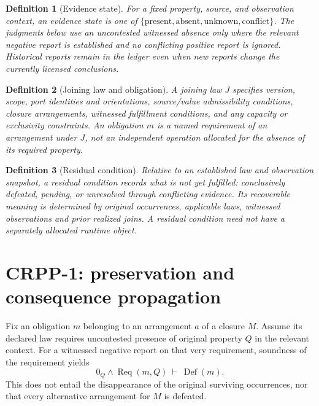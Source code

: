\documentclass[11pt]{article}
\newtheorem{definition}{Definition}[section]
\newcommand{\Req}{\operatorname{Req}}
\newcommand{\Def}{\operatorname{Def}}
\begin{document}
\begin{definition}[Evidence state]
For a fixed property, source, and observation context, an evidence state is
one of $\{\mathrm{present},\mathrm{absent},\mathrm{unknown},\mathrm{conflict}\}$.
The judgments below use an uncontested witnessed absence only where the
relevant negative report is established and no conflicting positive report
is ignored. Historical reports remain in the ledger even when new reports
change the currently licensed conclusions.
\end{definition}

\begin{definition}[Joining law and obligation]
A joining law $J$ specifies version, scope, port identities and orientations,
source/value admissibility conditions, closure arrangements, witnessed
fulfillment conditions, and any capacity or exclusivity constraints.
An obligation $m$ is a named requirement of an arrangement under $J$,
not an independent operation allocated for the absence of its required
property.
\end{definition}

\begin{definition}[Residual condition]
Relative to an established law and observation snapshot, a residual
condition records what is \emph{not yet fulfilled}: conclusively
defeated, pending, or unresolved through conflicting evidence.
Its recoverable meaning is determined by original occurrences, applicable
laws, witnessed observations and prior realized joins. A residual condition
need not have a separately allocated runtime object.
\end{definition}

\section{CRPP-1: preservation and consequence propagation}
Fix an obligation $m$ belonging to an arrangement $a$ of a closure $M$.
Assume its declared law requires uncontested presence of original property
$Q$ in the relevant context. For a witnessed negative report on that very
requirement, soundness of the requirement yields
\begin{equation}\label{eq:defeat}
  0_Q\land\Req(m,Q)\ \vdash\ \Def(m).
\end{equation}
This does not entail the disappearance of the original surviving occurrences,
nor that every alternative arrangement for $M$ is defeated.
\end{document}
